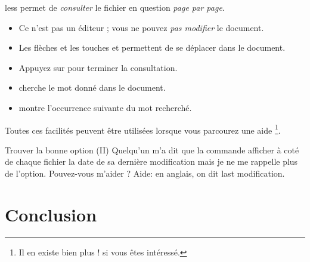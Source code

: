 \documentclass[a4paper,11pt]{style-esi/td}
\begin{document}
		\begin{theorie}{less}
			permet de \emph{consulter} le fichier en question \emph{page par page}.
			\begin{itemize}
			\item
				Ce n'est pas un éditeur ; vous ne pouvez \emph{pas modifier} le document.
			\item 
				Les flèches et les touches  et 
				permettent de se déplacer dans le document.
			\item 
				Appuyez sur  pour terminer la consultation. 
			\item 
				 cherche le mot donné dans le document.
			\item 
				 montre l'occurrence suivante du mot recherché.
			\end{itemize}
		\end{theorie}

		Toutes ces facilités peuvent être utilisées lorsque vous parcourez
		une aide%
		\footnote{%
			Il en existe bien plus !  si vous êtes intéressé.
		}.

		\begin{Exercice}{Trouver la bonne option (II)}
			Quelqu'un m'a dit que la commande 
			afficher à coté de chaque fichier la date de sa dernière modification
			mais je ne me rappelle plus de l'option. 
			Pouvez-vous m'aider ?
			Aide: en anglais, on dit \og{}last modification\fg{}.
		\end{Exercice}

\section{Conclusion}
\end{document}
